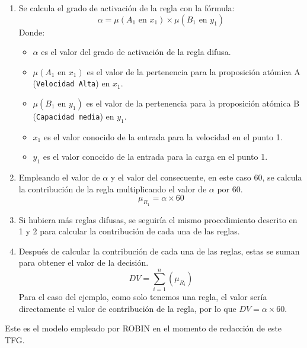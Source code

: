 \begin{enumerate}
    \item Se calcula el grado de activación de la regla con la fórmula:
        \begin{equation}
            \alpha= \mu(\text{$A_1$ en $x_1$}) \times \mu(\text{$B_1$ en $y_1$})
        \end{equation}
    Donde:
        \begin{itemize}
            \item $\alpha$ es el valor del grado de activación de la regla difusa.
            \item $\mu(\text{$A_1$ en $x_1$})$ es el valor de la pertenencia para la proposición atómica A (\texttt{Velocidad Alta}) en $x_1$.
            \item $\mu(\text{$B_1$ en $y_1$})$ es el valor de la pertenencia para la proposición atómica B (\texttt{Capacidad media}) en $y_1$.
            \item $x_1$ es el valor conocido de la entrada para la velocidad en el punto 1.
            \item $y_1$ es el valor conocido de la entrada para la carga en el punto 1.
        \end{itemize}
    \item Empleando el valor de $\alpha$ y el valor del consecuente, en este caso 60, se calcula la contribución de la regla multiplicando el valor de $\alpha$ por 60.        \begin{equation}
            \mu_{R_1} = \alpha \times 60
        \end{equation}
    \item Si hubiera más reglas difusas, se seguiría el mismo procedimiento descrito en 1 y 2 para calcular la contribución de cada una de las reglas.
    \item Después de calcular la contribución de cada una de las reglas, estas se suman para obtener el valor de la decisión.
        \begin{equation}
            DV = \sum_{i=1}^n (\mu_{R_i})
        \end{equation}
    Para el caso del ejemplo, como solo tenemos una regla, el valor sería directamente el valor de contribución de la regla, por lo que \(DV=\alpha\times60\).
\end{enumerate}

Este es el modelo empleado por \acrshort{ROBIN} en el momento de redacción de este \acrshort{TFG}.